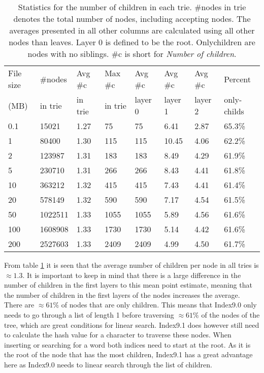 \begin{table}[ht!]
\centering
\begin{tabular}{l|lllllll}
 File size & \#nodes      & Avg \#c  & Max \#c  & Avg \#c & Avg \#c & Avg \#c & Percent          \\
 (MB)     & in trie     & in trie  &  in trie  & layer 0 & layer 1 & layer 2 & only-childs   \\\hline
 0.1      & 15021   & 1.27 & 75   & 75       & 6.41     & 2.87     & 65.3\%                   \\
 1        & 80400   & 1.30 & 115  & 115      & 10.45    & 4.06     & 62.2\%             \\
 2        & 123987  & 1.31 & 183  & 183      & 8.49     & 4.29     & 61.9\%             \\
 5        & 230710  & 1.31 & 266  & 266      & 8.43     & 4.41     & 61.8\%             \\
 10       & 363212  & 1.32 & 415  & 415      & 7.43     & 4.41     & 61.4\%             \\
 20       & 578149  & 1.32 & 590  & 590      & 7.17     & 4.54     & 61.5\%             \\
 50       & 1022511 & 1.33 & 1055 & 1055     & 5.89     & 4.56     & 61.6\%             \\
 100      & 1608908 & 1.33 & 1730 & 1730     & 5.14     & 4.42     & 61.6\%             \\
 200      & 2527603 & 1.33 & 2409 & 2409     & 4.99     & 4.50     & 61.7\%             \\
\end{tabular}
\caption{Statistics for the number of children in each trie. \#nodes in trie denotes the total number of nodes, including accepting nodes. The averages presented in all other columns are calculated using all other nodes than leaves. Layer 0 is defined to be the root. Onlychildren are nodes with no siblings. \#c is short for \textit{Number of children}. }
\label{tab:triecount}
\end{table}

From table  \ref{tab:triecount} it is seen that the average number of children per node in all tries is $\approx 1.3$. It is important to keep in mind that there is a large difference in the number of children in the first layers to this mean point estimate, meaning that the number of children in the first layers of the nodes increases the average.  There are $\approx 61\%$ of nodes that are only children. This means that Index9.0 only needs to go through a list of length 1 before traversing $\approx 61\%$ of the nodes of the tree, which are great conditions for linear search. Index9.1 does however still need to calculate the hash value for a character to traverse these nodes. When inserting or searching for a word both indices need to start at the root. As it is the root of the node that has the most children, Index9.1 has a great advantage here as Index9.0 needs to linear search through the list of children.

